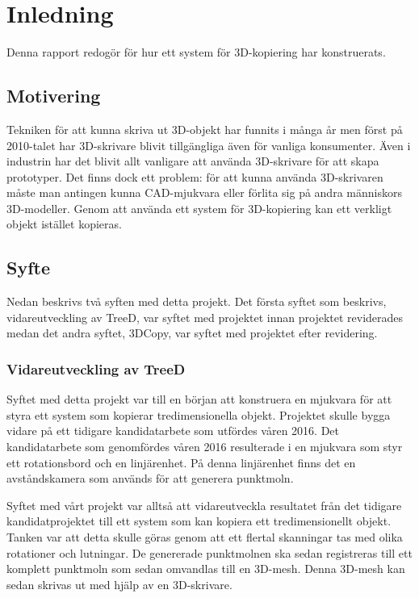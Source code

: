 \chapter{Inledning}
\label{cha:introduction}

Denna rapport redogör för hur ett system för 3D-kopiering har konstruerats. 
\section{Motivering}
\label{sec:motivation}



Tekniken för att kunna skriva ut 3D-objekt har funnits i många år men först på 2010-talet har 3D-skrivare blivit tillgängliga även för vanliga konsumenter. Även i industrin har det blivit allt vanligare att använda 3D-skrivare för att skapa prototyper. Det finns dock ett problem: för att kunna använda 3D-skrivaren måste man antingen kunna CAD-mjukvara eller förlita sig på andra människors 3D-modeller. Genom att använda ett system för 3D-kopiering kan ett verkligt objekt istället kopieras.


\section{Syfte}
\label{sec:aim}

Nedan beskrivs två syften med detta projekt. Det första syftet som beskrivs, vidareutveckling av TreeD, var syftet med projektet innan projektet reviderades medan det andra syftet, 3DCopy, var syftet med projektet efter revidering.

\subsection{Vidareutveckling av TreeD}
Syftet med detta projekt var till en början att konstruera en mjukvara för att styra ett system som kopierar tredimensionella objekt. Projektet skulle bygga vidare på ett tidigare kandidatarbete som utfördes våren 2016. Det kandidatarbete som genomfördes våren 2016 resulterade i en mjukvara som styr ett rotationsbord och en linjärenhet. På denna linjärenhet finns det en avståndskamera som används för att generera punktmoln. 

Syftet med vårt projekt var alltså att vidareutveckla resultatet från det tidigare kandidatprojektet till ett system som kan kopiera ett tredimensionellt objekt. Tanken var att detta skulle göras genom att ett flertal skanningar tas med olika rotationer och lutningar. De genererade punktmolnen ska sedan registreras till ett komplett punktmoln som sedan omvandlas till en 3D-mesh. Denna 3D-mesh kan sedan skrivas ut med hjälp av en 3D-skrivare.

